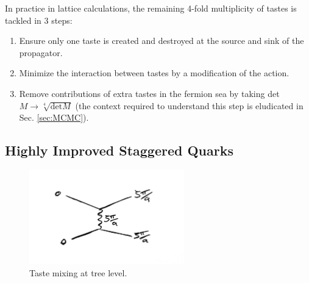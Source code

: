     In practice in lattice calculations, the remaining 4-fold multiplicity of tastes is tackled in 3 steps:
    \begin{enumerate}
    \item
      Ensure only one taste is created and destroyed at the source and sink of the propagator.
    \item
      Minimize the interaction between tastes by a modification of the action.
    \item
      Remove contributions of extra tastes in the fermion sea by taking det$M \to \sqrt[4]{\text{det}M}$ (the context required to understand this step is eludicated in Sec. \ref{sec:MCMC}).
    \end{enumerate}


    \subsection{Highly Improved Staggered Quarks}
    \label{sec:HISQ}

    \begin{figure}
      \vspace{-10pt}
      \begin{center}
        \includegraphics[width=
          0.6\textwidth]{images/taste_exchange.jpg}
      \end{center}
      \vspace{-30pt}
      \caption{Taste mixing at tree level.}
      \label{fig:tastemixing}
    \end{figure}

